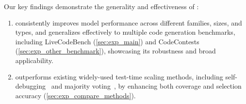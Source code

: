 Our key findings demonstrate the generality and effectiveness of \frameworkname:
\begin{enumerate}
\item \frameworkname consistently improves model performance across different families, sizes, and types, and generalizes effectively to multiple code generation benchmarks, including LiveCodeBench (\cref{sec:exp_main}) and CodeContests (\cref{sec:exp_other_benchmark}), showcasing its robustness and broad applicability.
\item \frameworkname outperforms existing widely-used test-time scaling methods, including self-debugging~\citep{chen2023teaching} and majority voting~\citep{wang2022self, li2022competition}, by enhancing both coverage and selection accuracy (\cref{sec:exp_compare_methods}).
\end{enumerate}


